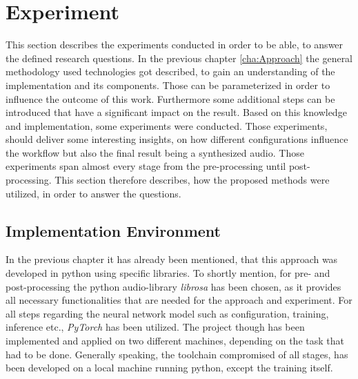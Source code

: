\chapter{Experiment}
\label{cha:Experiment}
This section describes the experiments conducted in order to be able, to answer the defined research questions. In the previous chapter \ref{cha:Approach} the general methodology used technologies got described, to gain an understanding of the implementation and its components. Those can be parameterized in order to influence the outcome of this work. Furthermore some additional steps can be introduced that have a significant impact on the result. Based on this knowledge and implementation, some experiments were conducted. Those experiments, should deliver some interesting insights, on how different configurations influence the workflow but also the final result being a synthesized audio. Those experiments span almost every stage from the pre-processing until post-processing. This section therefore describes, how the proposed methods were utilized, in order to answer the questions.







\section{Implementation Environment}
In the previous chapter it has already been mentioned, that this approach was developed in python using specific libraries. To shortly mention, for pre- and post-processing the python audio-library \textit{librosa} \cite{brian_mcfee_2022_6097378} has been chosen, as it provides all necessary functionalities that are needed for the approach and experiment. For all steps regarding the neural network model such as configuration, training, inference etc., \textit{PyTorch} \cite{paszke2019pytorch} has been utilized. The project though has been implemented and applied on two different machines, depending on the task that had to be done. Generally speaking, the toolchain compromised of all stages, has been developed on a local machine running python, except the training itself. 

